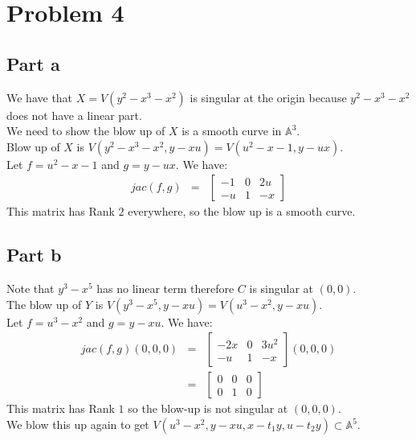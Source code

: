 \documentclass[12pt]{article}
\begin{document}
\clearpage
\section*{Problem 4}
\subsection*{Part a}
We have that $X=V(y^2-x^3-x^2)$ is singular at the origin because $y^2-x^3-x^2$ does not have a linear part. \\
We need to show the blow up of $X$ is a smooth curve in $\mathbb{A}^3$.\\
Blow up of $X$ is $V(y^2-x^3-x^2,y-xu)=V(u^2-x-1,y-ux)$. \\
Let $f=u^2-x-1$ and $g=y-ux$. We have:
\begin{eqnarray*}
jac(f,g) &=&
\begin{bmatrix}
-1 & 0 & 2u \\
-u & 1 & -x
\end{bmatrix}
\end{eqnarray*}
This matrix has Rank $2$ everywhere, so the blow up is a smooth curve.
\subsection*{Part b}
Note that $y^3-x^5$ has no linear term therefore $C$ is singular at $(0,0)$.\\
The blow up of $Y$ is $V(y^3-x^5,y-xu)=V(u^3-x^2,y-xu)$. \\
Let $f=u^3-x^2$ and $g=y-xu$. We have: 
\begin{eqnarray*}
jac(f,g)(0,0,0) &=& 
\begin{bmatrix}
-2x & 0 & 3u^2 \\
-u & 1 & -x
\end{bmatrix}
(0,0,0) \\&=&
\begin{bmatrix}
0 & 0 & 0 \\
0 &1 & 0
\end{bmatrix}
\end{eqnarray*}
This matrix has Rank $1$ so the blow-up is not singular at $(0,0,0)$. \\
We blow this up again to get $V(u^3-x^2,y-xu,x-t_1y,u-t_2y)\subset \mathbb{A}^5$.
\end{document}
